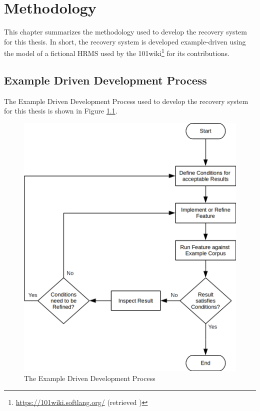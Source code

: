 \chapter{Methodology}
This chapter summarizes the methodology used to develop the recovery system for this thesis.
In short, the recovery system is developed example-driven using the model of a fictional \gls{HRMS} used by the 101wiki\footnote{\url{https://101wiki.softlang.org/} (retrieved )} for its contributions.

\section{Example Driven Development Process}
The Example Driven Development Process used to develop the recovery system for this thesis is shown in Figure \ref{figure:ExampleDrivenDevelopment}.
\begin{figure}[h!]
\begin{center}
\includegraphics[scale=.4]{images/ExampleDrivenDevelopment.png}
\end{center}
\caption{The Example Driven Development Process}
\label{figure:ExampleDrivenDevelopment}
\end{figure}
